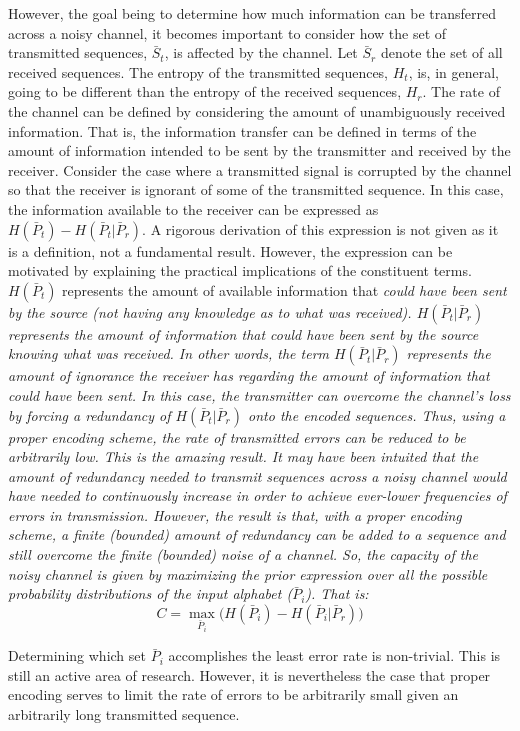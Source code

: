 \documentclass[letterpaper,twoside,10pt]{article}
\begin{document}
However, the goal being to determine how much information can be transferred across a noisy channel, it becomes important to consider how the set of transmitted sequences, $\bar S_t$, is affected by the channel. Let $\bar S_r$ denote the set of all received sequences. The entropy of the transmitted sequences, $H_t$, is, in general, going to be different than the entropy of the received sequences, $H_r$. The rate of the channel can be defined by considering the amount of unambiguously received information. That is, the information transfer can be defined in terms of the amount of information intended to be sent by the transmitter and received by the receiver. Consider the case where a transmitted signal is corrupted by the channel so that the receiver is ignorant of some of the transmitted sequence. In this case, the information available to the receiver can be expressed as $H(\bar P_t) - H(\bar P_t | \bar P_r)$. A rigorous derivation of this expression is not given as it is a definition, not a fundamental result. However, the expression can be motivated by explaining the practical implications of the constituent terms. $H(\bar P_t)$ represents the amount of available information that \em could have \em been sent by the source (not having any knowledge as to what was received). $H(\bar P_t | \bar P_r)$ represents the amount of information that could have been sent by the source \em knowing what was received\em. In other words, the term $H(\bar P_t | \bar P_r)$ represents the amount of ignorance the receiver has regarding the amount of information that could have been sent. In this case, the transmitter can overcome the channel's loss by forcing a redundancy of $H(\bar P_t | \bar P_r)$ onto the encoded sequences. Thus, using a proper encoding scheme, the rate of transmitted errors can be reduced to be arbitrarily low. This is the amazing result. It may have been intuited that the amount of redundancy needed to transmit sequences across a noisy channel would have needed to continuously increase in order to achieve ever-lower frequencies of errors in transmission. However, the result is that, with a proper encoding scheme, a finite (bounded) amount of redundancy can be added to a sequence and still overcome the finite (bounded) noise of a channel. So, the capacity of the noisy channel is given by maximizing the prior expression over all the possible probability distributions of the input alphabet ($\bar P_i$). That is: \[C = \max_{\bar P_i}\Big(H(\bar P_i)-H(\bar P_i|\bar P_r)\Big) \]

Determining which set $\bar P_i$ accomplishes the least error rate is non-trivial. This is still an active area of research. However, it is nevertheless the case that proper encoding serves to limit the rate of errors to be arbitrarily small given an arbitrarily long transmitted sequence.
\end{document}
